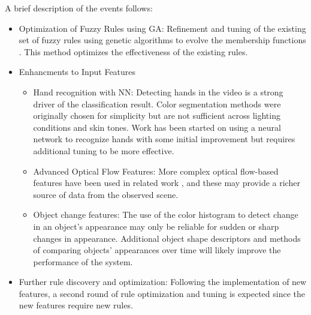 \documentclass[12pt]{report}
\begin{document}
A brief description of the events follows:
\begin{itemize}
    \item Optimization of Fuzzy Rules using GA: Refinement and tuning of the existing set of fuzzy rules using genetic algorithms to evolve the membership functions \cite{Tan1999OptimizationRating}. This method optimizes the effectiveness of the existing rules.
    \item Enhancments to Input Features
    \begin{itemize}
        \item Hand recognition with NN: Detecting hands in the video is a strong driver of the classification result. Color segmentation methods were originally chosen for simplicity but are not sufficient across lighting conditions and skin tones. Work has been started on using a neural network to recognize hands with some initial improvement but requires additional tuning to be more effective.
        \item Advanced Optical Flow Features: More complex optical flow-based features have been used in related work \cite{Ryoo2015, Abebe2016}, and these may provide a richer source of data from the observed scene.
        \item Object change features: The use of the color histogram to detect change in an object's appearance may only be reliable for sudden or sharp changes in appearance. Additional object shape descriptors and methods of comparing objects' appearances over time will likely improve the performance of the system.
    \end{itemize}
    \item Further rule discovery and optimization: Following the implementation of new features, a second round of rule optimization and tuning is expected since the new features require new rules.
\end{itemize}

\end{document}
